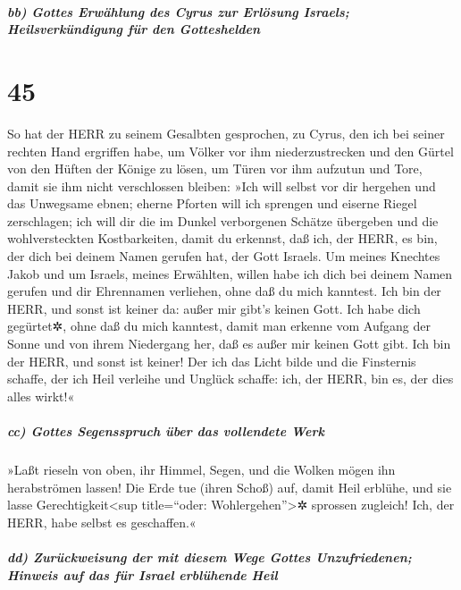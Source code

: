 \hypertarget{bb-gottes-erwuxe4hlung-des-cyrus-zur-erluxf6sung-israels-heilsverkuxfcndigung-fuxfcr-den-gotteshelden}{%
\subparagraph{bb) Gottes Erwählung des Cyrus zur Erlösung Israels;
Heilsverkündigung für den
Gotteshelden}\label{bb-gottes-erwuxe4hlung-des-cyrus-zur-erluxf6sung-israels-heilsverkuxfcndigung-fuxfcr-den-gotteshelden}}

\hypertarget{section-44}{%
\section{45}\label{section-44}}

So hat der HERR zu seinem Gesalbten gesprochen, zu Cyrus,
den ich bei seiner rechten Hand ergriffen habe, um Völker vor ihm
niederzustrecken und den Gürtel von den Hüften der Könige zu lösen, um
Türen vor ihm aufzutun und Tore, damit sie ihm nicht verschlossen
bleiben: »Ich will selbst vor dir hergehen und das
Unwegsame ebnen; eherne Pforten will ich sprengen und eiserne Riegel
zerschlagen; ich will dir die im Dunkel verborgenen
Schätze übergeben und die wohlversteckten Kostbarkeiten, damit du
erkennst, daß ich, der HERR, es bin, der dich bei deinem Namen gerufen
hat, der Gott Israels. Um meines Knechtes Jakob und um
Israels, meines Erwählten, willen habe ich dich bei deinem Namen gerufen
und dir Ehrennamen verliehen, ohne daß du mich kanntest.
Ich bin der HERR, und sonst ist keiner da: außer mir
gibt's keinen Gott. Ich habe dich gegürtet✲, ohne daß du mich kanntest,
damit man erkenne vom Aufgang der Sonne und von ihrem
Niedergang her, daß es außer mir keinen Gott gibt. Ich bin der HERR, und
sonst ist keiner! Der ich das Licht bilde und die
Finsternis schaffe, der ich Heil verleihe und Unglück schaffe: ich, der
HERR, bin es, der dies alles wirkt!«

\hypertarget{cc-gottes-segensspruch-uxfcber-das-vollendete-werk}{%
\subparagraph{cc) Gottes Segensspruch über das vollendete
Werk}\label{cc-gottes-segensspruch-uxfcber-das-vollendete-werk}}

»Laßt rieseln von oben, ihr Himmel, Segen, und die Wolken
mögen ihn herabströmen lassen! Die Erde tue (ihren Schoß) auf, damit
Heil erblühe, und sie lasse Gerechtigkeit\textless sup title=``oder:
Wohlergehen''\textgreater✲ sprossen zugleich! Ich, der HERR, habe selbst
es geschaffen.«

\hypertarget{dd-zuruxfcckweisung-der-mit-diesem-wege-gottes-unzufriedenen-hinweis-auf-das-fuxfcr-israel-erbluxfchende-heil}{%
\subparagraph{dd) Zurückweisung der mit diesem Wege Gottes
Unzufriedenen; Hinweis auf das für Israel erblühende
Heil}\label{dd-zuruxfcckweisung-der-mit-diesem-wege-gottes-unzufriedenen-hinweis-auf-das-fuxfcr-israel-erbluxfchende-heil}}

